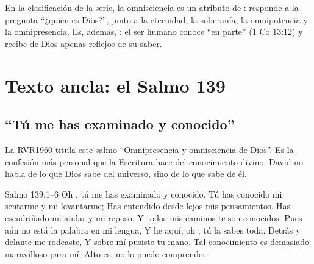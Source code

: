 En la clasificación de la serie, la omnisciencia es un atributo de : responde a la pregunta ``¿quién es Dios?'', junto a la eternidad, la soberanía, la omnipotencia y la omnipresencia. Es, además, : el ser humano conoce ``en parte'' (1 Co 13:12) y recibe de Dios apenas reflejos de su saber.

\section{Texto ancla: el Salmo 139}

\subsection{“Tú me has examinado y conocido”}
La RVR1960 titula este salmo ``Omnipresencia y omnisciencia de Dios''. Es la confesión más personal que la Escritura hace del conocimiento divino: David no habla de lo que Dios sabe del universo, sino de lo que sabe de él.

\begin{verso}{Salmo 139:1–6}
Oh \SENOR{}, tú me has examinado y conocido. Tú has conocido mi sentarme y mi levantarme; Has entendido desde lejos mis pensamientos. Has escudriñado mi andar y mi reposo, Y todos mis caminos te son conocidos. Pues aún no está la palabra en mi lengua, Y he aquí, oh \SENOR{}, tú la sabes toda. Detrás y delante me rodeaste, Y sobre mí pusiste tu mano. Tal conocimiento es demasiado maravilloso para mí; Alto es, no lo puedo comprender.
\end{verso}

